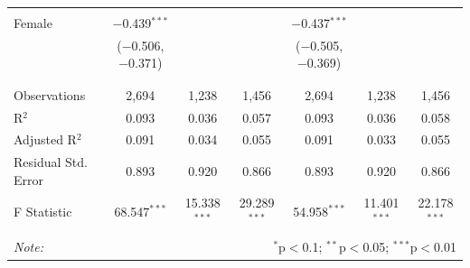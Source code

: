 \documentclass[12pt,a4paper]{article}
\numberwithin{equation}{section}
\begin{document}
\begin{landscape}
\begin{table}[!htbp]
\begin{tabular}{@{\extracolsep{5pt}}lcccccc}
			& & & & & & \\ 
			Female & $-$0.439$^{***}$ &  &  & $-$0.437$^{***}$ &  &  \\ 
			& ($-$0.506, $-$0.371) &  &  & ($-$0.505, $-$0.369) &  &  \\ 
			& & & & & & \\ 
			\hline \\[-1.8ex] 
			Observations & 2,694 & 1,238 & 1,456 & 2,694 & 1,238 & 1,456 \\ 
			R$^{2}$ & 0.093 & 0.036 & 0.057 & 0.093 & 0.036 & 0.058 \\ 
			Adjusted R$^{2}$ & 0.091 & 0.034 & 0.055 & 0.091 & 0.033 & 0.055 \\ 
			Residual Std. Error & 0.893 & 0.920 & 0.866 & 0.893 & 0.920 & 0.866 \\ 
			F Statistic & 68.547$^{***}$ & 15.338$^{***}$ & 29.289$^{***}$ & 54.958$^{***}$ & 11.401$^{***}$ & 22.178$^{***}$ \\ 
			\hline 
			\hline \\[-1.8ex] 
			\textit{Note:}  & \multicolumn{6}{r}{$^{*}$p$<$0.1; $^{**}$p$<$0.05; $^{***}$p$<$0.01} \\ 
		\end{tabular} 
	\end{table} 
	
\end{landscape}

\newpage
\end{document}
